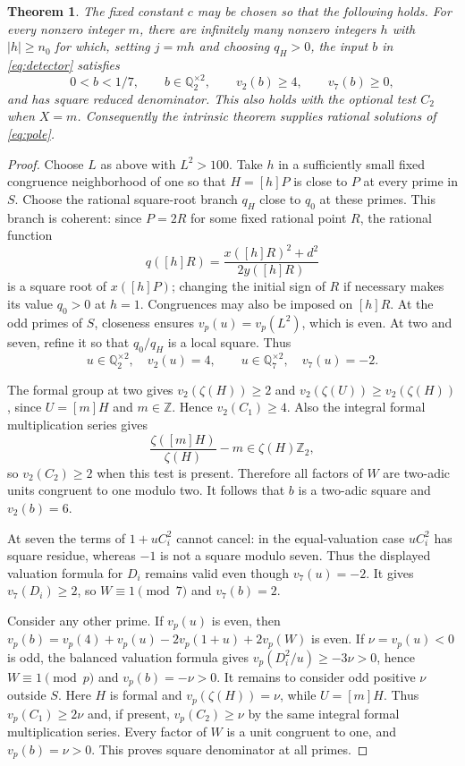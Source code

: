 \documentclass[11pt,a4paper]{article}
\newtheorem{theorem}{Theorem}[section]
\newcommand{\Q}{\mathbb Q}\newcommand{\Z}{\mathbb Z}
\begin{document}
\begin{theorem}\label{thm:complete}
The fixed constant $c$ may be chosen so that the following holds.
For every nonzero integer $m$, there are infinitely many nonzero
integers $h$ with $|h|\ge n_0$ for which, setting $j=mh$ and
choosing $q_H>0$, the input $b$ in \eqref{eq:detector} satisfies
\[
 0<b<1/7,\qquad b\in\Q_2^{\times2},\qquad v_2(b)\ge4,
 \qquad v_7(b)\ge0,
\]
and has square reduced denominator. This also holds with the
optional test $C_2$ when $X=m$. Consequently the intrinsic
theorem supplies rational solutions of \eqref{eq:pole}.
\end{theorem}
\begin{proof}
Choose $L$ as above with $L^2>100$. Take $h$ in a sufficiently
small fixed congruence neighborhood of one so that $H=[h]P$
is close to $P$ at every prime in $S$. Choose the rational
square-root branch $q_H$ close to $q_0$ at these primes. This
branch is coherent: since $P=2R$ for some fixed rational point
$R$, the rational function
\[
        q([h]R)=\frac{x([h]R)^2+d^2}{2y([h]R)}
\]
is a square root of $x([h]P)$; changing the initial sign of $R$
if necessary makes its value $q_0>0$ at $h=1$. Congruences
may also be imposed on $[h]R$.
At the odd primes of $S$, closeness ensures
$v_p(u)=v_p(L^2)$, which is even. At two and seven, refine it
so that $q_0/q_H$ is a local square. Thus
\[
 u\in\Q_2^{\times2},\quad v_2(u)=4,\qquad
 u\in\Q_7^{\times2},\quad v_7(u)=-2.
\]

The formal group at two gives $v_2(\zeta(H))\ge2$ and
$v_2(\zeta(U))\ge v_2(\zeta(H))$, since $U=[m]H$ and
$m\in\Z$. Hence $v_2(C_1)\ge4$. Also the integral formal
multiplication series gives
\[
       \frac{\zeta([m]H)}{\zeta(H)}-m
                      \in\zeta(H)\Z_2,
\]
so $v_2(C_2)\ge2$ when this test is present. Therefore all
factors of $W$ are two-adic units congruent to one modulo two.
It follows that $b$ is a two-adic square and $v_2(b)=6$.

At seven the terms of $1+uC_i^2$ cannot cancel: in the
equal-valuation case $uC_i^2$ has square residue, whereas
$-1$ is not a square modulo seven. Thus the displayed valuation
formula for $D_i$ remains valid even though $v_7(u)=-2$.
It gives $v_7(D_i)\ge2$, so $W\equiv1\pmod7$ and $v_7(b)=2$.

Consider any other prime. If $v_p(u)$ is even, then
$v_p(b)=v_p(4)+v_p(u)-2v_p(1+u)+2v_p(W)$ is even.
If $\nu=v_p(u)<0$ is odd, the balanced valuation formula gives
$v_p(D_i^2/u)\ge-3\nu>0$, hence $W\equiv1\pmod p$ and
$v_p(b)=-\nu>0$.
It remains to consider odd positive $\nu$ outside $S$.
Here $H$ is formal and $v_p(\zeta(H))=\nu$, while $U=[m]H$.
Thus $v_p(C_1)\ge2\nu$ and, if present,
$v_p(C_2)\ge\nu$ by the same integral formal multiplication
series. Every factor of $W$ is a unit congruent to one, and
$v_p(b)=\nu>0$. This proves square denominator at all primes.


\end{proof}
\end{document}
